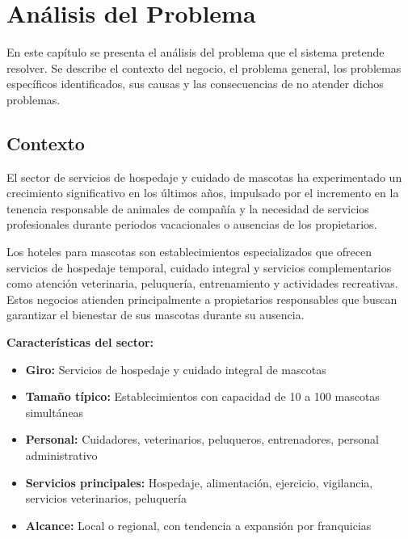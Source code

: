 \chapter{Análisis del Problema}	
\label{cap:analisisProblema}

	En este capítulo se presenta el análisis del problema que el sistema pretende resolver. Se describe el contexto del negocio, el problema general, los problemas específicos identificados, sus causas y las consecuencias de no atender dichos problemas.

\section{Contexto}
\label{sec:contexto}

	El sector de servicios de hospedaje y cuidado de mascotas ha experimentado un crecimiento significativo en los últimos años, impulsado por el incremento en la tenencia responsable de animales de compañía y la necesidad de servicios profesionales durante periodos vacacionales o ausencias de los propietarios.
	
	Los hoteles para mascotas son establecimientos especializados que ofrecen servicios de hospedaje temporal, cuidado integral y servicios complementarios como atención veterinaria, peluquería, entrenamiento y actividades recreativas. Estos negocios atienden principalmente a propietarios responsables que buscan garantizar el bienestar de sus mascotas durante su ausencia.
	
	\textbf{Características del sector:}
	\begin{itemize}
		\item \textbf{Giro:} Servicios de hospedaje y cuidado integral de mascotas
		\item \textbf{Tamaño típico:} Establecimientos con capacidad de 10 a 100 mascotas simultáneas
		\item \textbf{Personal:} Cuidadores, veterinarios, peluqueros, entrenadores, personal administrativo
		\item \textbf{Servicios principales:} Hospedaje, alimentación, ejercicio, vigilancia, servicios veterinarios, peluquería
		\item \textbf{Alcance:} Local o regional, con tendencia a expansión por franquicias
	\end{itemize}
	
